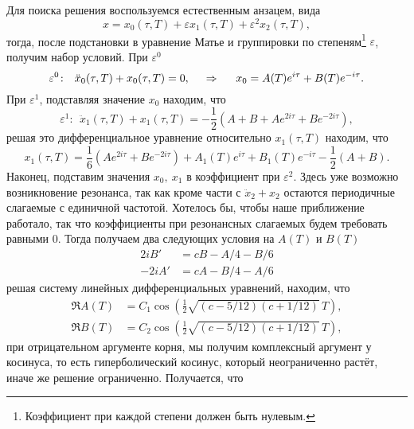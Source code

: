 Для поиска решения воспользуемся естественным анзацем, вида
\begin{equation*}
    x = x_0(\tau, T) + \varepsilon x_1 (\tau, T) + \varepsilon^2 x_2 (\tau, T),
\end{equation*}
тогда, после подстановки в уравнение Матье и группировки по степеням\footnote{
    Коэффициент при каждой степени должен быть нулевым.
}  $\varepsilon$, получим набор условий. При $\varepsilon^0$
\begin{equation*}
    \varepsilon^0 \colon \ \ \ddot{x}_0(\tau, T) +  x_0(\tau, T) = 0,
    \hspace{0.5cm} \Rightarrow \hspace{0.5cm}
    x_0 = A(T) e^{i\tau} + B(T) e^{-i\tau}.
\end{equation*}
При $\varepsilon^1$, подставляя значение $x_0$ находим, что
\begin{equation*}
    \varepsilon^1 \colon \ \ \ddot{x}_1(\tau, T) +  x_1(\tau, T) 
    = -\frac{1}{2}\left(
        A+B + A e^{2 i \tau} + B e^{- 2 i \tau}
    \right)
    ,
\end{equation*}
решая это дифференциальное уравнение относительно $x_1(\tau, T)$ находим, что
\begin{equation*}
    x_1(\tau, T) = \frac{1}{6} (Ae^{2 i \tau} + B e^{-2 i \tau}) + 
    A_1(T) e^{i \tau} + B_1(T) e^{-i \tau} - \frac{1}{2}(A+B).
\end{equation*}
Наконец, подставим значения $x_0,\ x_1$ в коэффициент при $\varepsilon^2$. Здесь уже возможно возникновение резонанса, так как кроме части с $\ddot{x}_2 + x_2$ остаются периодичные слагаемые с единичной частотой. Хотелось бы, чтобы наше приближение работало, так что коэффициенты при резонансных слагаемых будем требовать равными 0. Тогда получаем два следующих условия на $A(T)$ и $B(T)$ 
\begin{align*}
    2 i B' &= c B - A/4 - B/6 \\
    -2 i A' &= c A - B/4 - A/6
\end{align*}
решая систему линейных дифференциальных уравнений, находим, что
\begin{align*}
    \Re A(T) &= C_1 \cos\left(
        \frac{1}{2} \sqrt{(c - 5/12)(c+1/12)}\, T
    \right), \\
    \Re B(T) &= C_2 \cos\left(
        \frac{1}{2} \sqrt{(c - 5/12)(c+1/12)}\, T
    \right),
\end{align*}
при отрицательном аргументе корня, мы получим комплексный аргумент у косинуса, то есть гиперболический косинус, который неограниченно растёт, иначе же решение ограниченно. Получается, что
